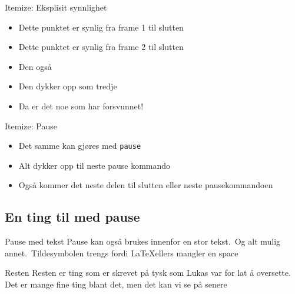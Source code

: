 \begin{frame}{Itemize: Eksplisit synnlighet}
\begin{itemize}
    \item<1-> Dette punktet er synlig fra frame 1 til slutten
    \item<2-> Dette punktet er synlig fra frame 2 til slutten
    \item<2-3> Den også
    \item<3-> Den dykker opp som tredje
    \item<4-> Da er det noe som har forsvunnet!
\end{itemize}

\end{frame}
\begin{frame}{Itemize: Pause}
\begin{itemize}
    \item Det samme kan gjøres med \texttt{pause}
    \item Alt dykker opp til neste pause kommando
    \pause
    \item Også kommer det neste delen til slutten eller neste pausekommandoen
\end{itemize}

\end{frame}

\subsection{En ting til med pause}
\begin{frame}{Pause med tekst}
Pause kan også brukes innenfor en stor tekst.\pause~Og alt mulig annet.\pause~Tildesymbolen trengs fordi \LaTeX ellers mangler en space
\end{frame}
%
\begin{frame}{Resten}
Resten er ting som er skrevet på tysk som Lukas var for lat å oversette. Det er mange fine ting blant det, men det kan vi se på senere
\end{frame}

